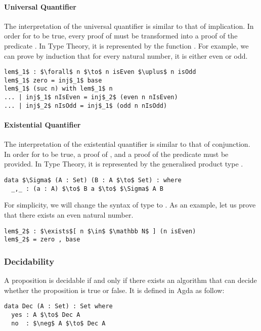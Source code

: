 \paragraph{Universal Quantifier} The interpretation of the universal
quantifier is similar to that of implication. In order for  to be true, every
proof  of  must be transformed into a proof of the predicate
. In Type Theory, it is represented by the function . For example, we can prove by induction that for every natural
number, it is either even or odd.
\begin{lstlisting}[mathescape=true,xleftmargin=.3\textwidth]
lem$_1$ : $\forall$ n $\to$ n isEven $\uplus$ n isOdd
lem$_1$ zero = inj$_1$ base
lem$_1$ (suc n) with lem$_1$ n
... | inj$_1$ nIsEven = inj$_2$ (even n nIsEven)
... | inj$_2$ nIsOdd = inj$_1$ (odd n nIsOdd)
\end{lstlisting} 

\paragraph{Existential Quantifier} The interpretation of the
existential quantifier is similar to that of conjunction. In order for
 to be true, a proof  of , and a proof of the predicate
 must be provided. In Type Theory, it is represented by the generalised
product type \mb{\Sigma}. 
\begin{lstlisting}[mathescape=true,xleftmargin=.3\textwidth]
data $\Sigma$ (A : Set) (B : A $\to$ Set) : where
  _,_ : (a : A) $\to$ B a $\to$ $\Sigma$ A B
\end{lstlisting}

\par For simplicity, we will change the syntax of \mb{\Sigma} type to
. As an example, let us prove that
there exists an even natural number. 
\begin{lstlisting}[mathescape=true,xleftmargin=.3\textwidth]
lem$_2$ : $\exists$[ n $\in$ $\mathbb N$ ] (n isEven)
lem$_2$ = zero , base
\end{lstlisting}


\subsubsection{Decidability} 
\par A proposition is decidable if and only if there
exists an algorithm that can decide whether the proposition is true or false. It is
defined in Agda as follow: 
\begin{lstlisting}[mathescape=true,xleftmargin=.3\textwidth]
data Dec (A : Set) : Set where
  yes : A $\to$ Dec A
  no  : $\neg$ A $\to$ Dec A
\end{lstlisting}

